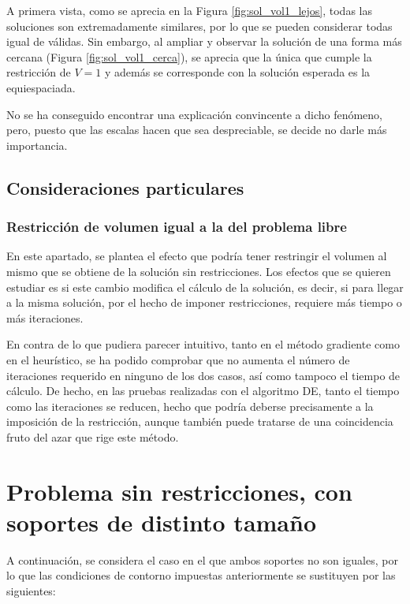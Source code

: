 A primera vista, como se aprecia en la Figura \ref{fig:sol_vol1_lejos}, todas las soluciones son extremadamente similares, por lo que se pueden considerar todas igual de válidas. Sin embargo, al ampliar y observar la solución de una forma más cercana (Figura \ref{fig:sol_vol1_cerca}), se aprecia que la única que cumple la restricción de $V = 1$ y además se corresponde con la solución esperada es la equiespaciada. 

No se ha conseguido encontrar una explicación convincente a dicho fenómeno, pero, puesto que las escalas hacen que sea despreciable, se decide no darle más importancia.


\subsection{Consideraciones particulares}

\subsubsection{Restricción de volumen igual a la del problema libre}

En este apartado, se plantea el efecto que podría tener restringir el volumen al mismo que se obtiene de la solución sin restricciones. Los efectos que se quieren estudiar es si este cambio modifica el cálculo de la solución, es decir, si para llegar a la misma solución, por el hecho de imponer restricciones, requiere más tiempo o más iteraciones.

En contra de lo que pudiera parecer intuitivo, tanto en el método gradiente como en el heurístico, se ha podido comprobar que no aumenta el número de iteraciones requerido en ninguno de los dos casos, así como tampoco el tiempo de cálculo. De hecho, en las pruebas realizadas con el algoritmo DE, tanto el tiempo como las iteraciones se reducen, hecho que podría deberse precisamente a la imposición de la restricción, aunque también puede tratarse de una coincidencia fruto del azar que rige este método.


\section{Problema sin restricciones, con soportes de distinto tamaño}

A continuación, se considera el caso en el que ambos soportes no son iguales, por lo que las condiciones de contorno impuestas anteriormente se sustituyen por las siguientes:

